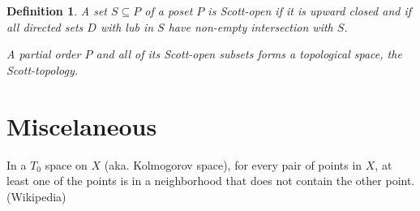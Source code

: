 \documentclass{article}
\newtheorem{definition}{Definition}%
\begin{document}
\begin{definition}
A set $S \subseteq P$ of a poset $P$ is Scott-open if it is upward
closed and if all directed sets $D$ with lub in $S$ have non-empty
intersection with $S$.

A partial order $P$ and all of its Scott-open subsets forms a
topological space, the Scott-topology.
\end{definition}

\section{Miscelaneous}

In a $T_0$ space on $X$ (aka. Kolmogorov space), for every pair of
points in $X$, at least one of the points is in a neighborhood that
does not contain the other point. (Wikipedia)
\end{document}

